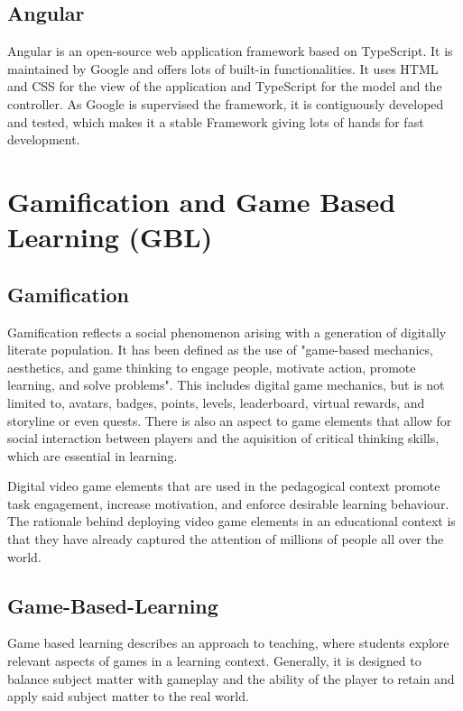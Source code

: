 \subsection{Angular}\label{subsec:angular}
Angular is an open-source web application framework based on TypeScript.
It is maintained by Google and offers lots of built-in functionalities.
It uses HTML and CSS for the view of the application and TypeScript for the model and the controller.
As Google is supervised the framework, it is contiguously developed and tested,
which makes it a stable Framework giving lots of hands for fast development.

\section{Gamification and Game Based Learning (GBL)}\label{sec:gamification-and-game-based-learninggbl}
\subsection{Gamification}\label{subsec:gamification}
Gamification reflects a social phenomenon arising with a generation of digitally literate population.
It has been defined as the use of "game-based mechanics, aesthetics, and game thinking to engage people,
motivate action, promote learning, and solve problems"\cite{kapp2013gamification}.
This includes digital game mechanics, but is not limited to, avatars, badges, points, levels,
leaderboard, virtual rewards, and storyline or even quests.
There is also an aspect to game elements that allow for social interaction between players and the aquisition of
critical thinking skills, which are essential in learning.

Digital video game elements that are used in the pedagogical context promote task engagement, increase motivation,
and enforce desirable learning behaviour.
The rationale behind deploying video game elements in an educational context is that they have already captured the
attention of millions of people all over the world.

\subsection{Game-Based-Learning}\label{subsec:game-based-learning}
Game based learning describes an approach to teaching,
where students explore relevant aspects of games in a learning context.
Generally, it is designed to balance subject matter with gameplay and the ability of the player
to retain and apply said subject matter to the real world.

